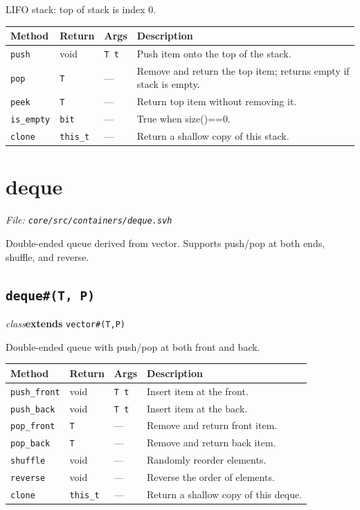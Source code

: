 \documentclass[11pt,letterpaper]{report}
\begin{document}
LIFO stack: top of stack is index 0.

\begin{xltabular}{\linewidth}{>{\small}p{1.35in} >{\small}p{1.25in} >{\small}p{0.95in} >{\small}X}
\toprule
\textbf{Method} & \textbf{Return} & \textbf{Args} & \textbf{Description} \\
\midrule
\endhead
\bottomrule
\endfoot
\texttt{push} & void & \texttt{T t} & Push item onto the top of the stack. \\
\texttt{pop} & \texttt{T} & --- & Remove and return the top item; returns empty if stack is empty. \\
\texttt{peek} & \texttt{T} & --- & Return top item without removing it. \\
\texttt{is\_empty} & \texttt{bit} & --- & True when size()==0. \\
\texttt{clone} & \texttt{this\_t} & --- & Return a shallow copy of this stack. \\
\end{xltabular}

\section{deque}
\noindent\small\textit{File: \texttt{core/src/containers/deque.svh}}\par

Double-ended queue derived from vector. Supports push/pop at both ends, shuffle, and reverse.

\subsection*{\texttt{deque\#(T, P)}}
\noindent\small\textit{class}\quad \textbf{extends} \texttt{vector\#(T,P)}\par

Double-ended queue with push/pop at both front and back.

\begin{xltabular}{\linewidth}{>{\small}p{1.35in} >{\small}p{1.25in} >{\small}p{0.95in} >{\small}X}
\toprule
\textbf{Method} & \textbf{Return} & \textbf{Args} & \textbf{Description} \\
\midrule
\endhead
\bottomrule
\endfoot
\texttt{push\_front} & void & \texttt{T t} & Insert item at the front. \\
\texttt{push\_back} & void & \texttt{T t} & Insert item at the back. \\
\texttt{pop\_front} & \texttt{T} & --- & Remove and return front item. \\
\texttt{pop\_back} & \texttt{T} & --- & Remove and return back item. \\
\texttt{shuffle} & void & --- & Randomly reorder elements. \\
\texttt{reverse} & void & --- & Reverse the order of elements. \\
\texttt{clone} & \texttt{this\_t} & --- & Return a shallow copy of this deque. \\
\end{xltabular}
\end{document}
